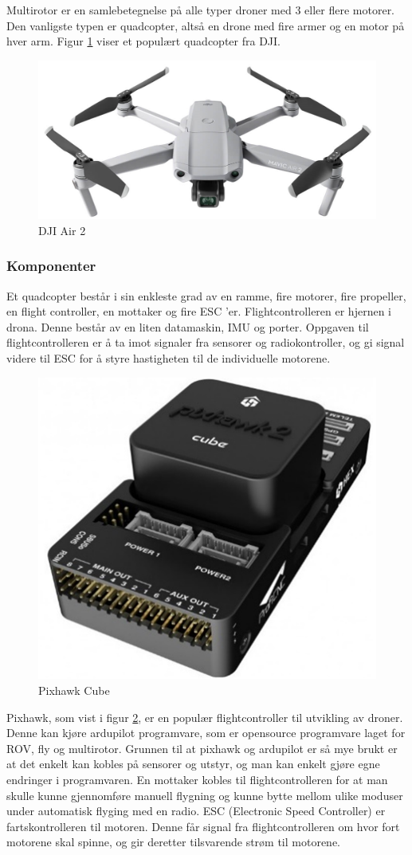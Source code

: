 Multirotor er en samlebetegnelse på alle typer droner med 3 eller flere motorer. Den vanligste typen er quadcopter, altså en drone med fire armer og en motor på hver arm. Figur \ref{fig:dji-air-2} viser et populært quadcopter fra DJI.

\begin{figure}[htp]
    \centering
    \includegraphics[width=0.7\columnwidth]{figures/dji-air-2}
    \caption{DJI Air 2}
    \label{fig:dji-air-2}
\end{figure}

\subsubsection{Komponenter}
Et quadcopter består i sin enkleste grad av en ramme, fire motorer, fire propeller, en flight controller, en mottaker og fire ESC ’er.
Flightcontrolleren er hjernen i drona. Denne består av en liten datamaskin, IMU og porter. Oppgaven til flightcontrolleren er å ta imot signaler fra sensorer og radiokontroller, og gi signal videre til ESC for å styre hastigheten til de individuelle motorene. 

\begin{figure}[htp]
    \centering
    \includegraphics[width=0.4\columnwidth]{figures/pixhawk}
    \caption{Pixhawk Cube}
    \label{fig:pixhawk}
\end{figure}

Pixhawk, som vist i figur \ref{fig:pixhawk}, er en populær flightcontroller til utvikling av droner. Denne kan kjøre ardupilot programvare, som er opensource programvare laget for ROV, fly og multirotor. Grunnen til at pixhawk og ardupilot er så mye brukt er at det enkelt kan kobles på sensorer og utstyr, og man kan enkelt gjøre egne endringer i programvaren. 
En mottaker kobles til flightcontrolleren for at man skulle kunne gjennomføre manuell flygning og kunne bytte mellom ulike moduser under automatisk flyging med en radio. 
ESC (Electronic Speed Controller) er fartskontrolleren til motoren. Denne får signal fra flightcontrolleren om hvor fort motorene skal spinne, og gir deretter tilsvarende strøm til motorene. 

